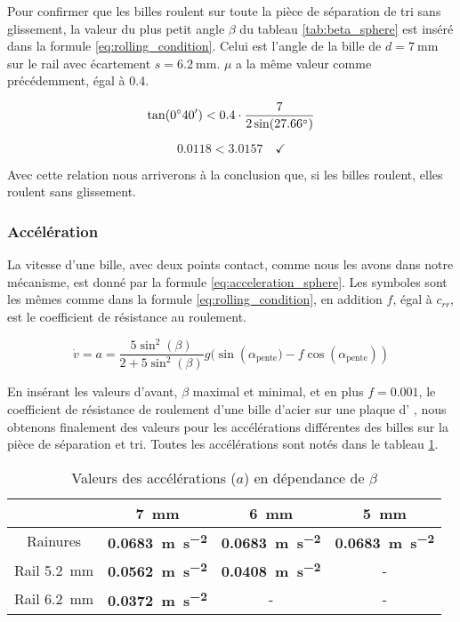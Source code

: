Pour confirmer que les billes roulent sur toute la pièce de séparation de tri sans glissement, la valeur du plus petit angle $\beta$ du tableau \ref{tab:beta_sphere} est inséré dans la formule \ref{eq:rolling_condition}. Celui est l'angle de la bille de $d = \SI{7}{\mm}$ sur le rail avec écartement $s = \SI{6.2}{\mm}$. $\mu$ a la même valeur comme précédemment, égal à \num{0.4}.

\[\sisetup{add-arc-degree-zero} \tan(\ang{;40;}) < \num{0.4} \cdot \frac{7}{2\sin(\ang{27.66})}\]

\[\num{0.0118} < \num{3.0157} \quad \checkmark\]

Avec cette relation nous arriverons à la conclusion que, si les billes roulent, elles roulent sans glissement.

\subsubsection{Accélération}
La vitesse d'une bille, avec deux points contact, comme nous les avons dans notre mécanisme, est donné par la formule \ref{eq:acceleration_sphere}. Les symboles sont les mêmes comme dans la formule \ref{eq:rolling_condition}, en addition $f$, égal à $c_{rr}$, est le coefficient de résistance au roulement.

\begin{equation}
    \dot{v} = a = \frac{5\sin^{2}(\beta)}{2+5\sin^{2}(\beta)} g(\sin({\alpha_{\text{pente}}) - f\cos(\alpha_{\text{pente}})})
    \label{eq:acceleration_sphere}
\end{equation}

En insérant les valeurs d'avant, $\beta$ maximal et minimal, et en plus $f = \num{0.001}$, le coefficient de résistance de roulement d'une bille d'acier sur une plaque d'%
, nous obtenons finalement des valeurs pour les accélérations différentes des billes sur la pièce de séparation et tri. Toutes les accélérations sont notés dans le tableau \ref{tab:accelerations_sphere}.

\begin{table}[htbp]
    \centering
    \begin{tabular}{|c|c|c|c|}
        \hline
         & \SI{7}{\mm} & \SI{6}{\mm} & \SI{5}{\mm} \\
        \hline
        Rainures & \textbf{\SI{0.0683}{\m\per\s\squared}} & \textbf{\SI{0.0683}{\m\per\s\squared}} & \textbf{\SI{0.0683}{\m\per\s\squared}} \\
        \hline
        Rail \SI{5.2}{\mm}& \textbf{\SI{0.0562}{\m\per\s\squared}} & \textbf{\SI{0.0408}{\m\per\s\squared}} & - \\
        \hline
        Rail \SI{6.2}{\mm}& \textbf{\SI{0.0372}{\m\per\s\squared}} & - & - \\
        \hline
    \end{tabular}
    \caption{Valeurs des accélérations ($a$) en dépendance de $\beta$}
    \label{tab:accelerations_sphere}
\end{table}

